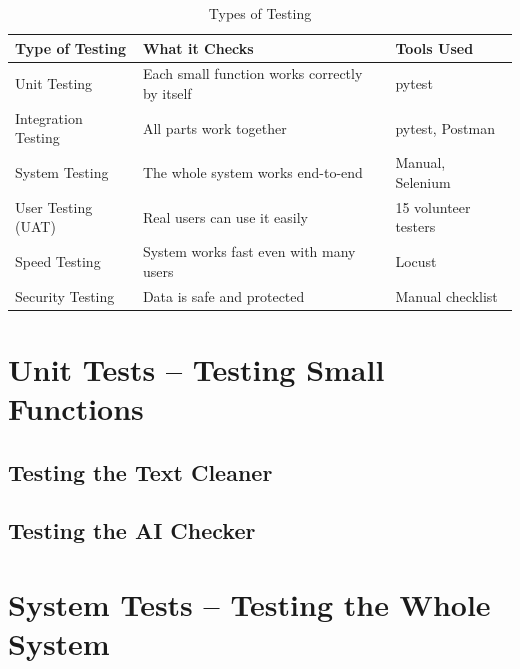 \documentclass[10pt, a4paper]{report}
\begin{document}
\begin{table}[H]
\centering
\caption{Types of Testing}
\begin{tabularx}{\textwidth}{lXl}
\toprule
\textbf{Type of Testing} & \textbf{What it Checks} & \textbf{Tools Used} \\
\midrule
Unit Testing & Each small function works correctly by itself & pytest \\
Integration Testing & All parts work together & pytest, Postman \\
System Testing & The whole system works end-to-end & Manual, Selenium \\
User Testing (UAT) & Real users can use it easily & 15 volunteer testers \\
Speed Testing & System works fast even with many users & Locust \\
Security Testing & Data is safe and protected & Manual checklist \\
\bottomrule
\end{tabularx}
\end{table}

\section{Unit Tests -- Testing Small Functions}

\subsection{Testing the Text Cleaner}

\subsection{Testing the AI Checker}

\section{System Tests -- Testing the Whole System}
\end{document}
